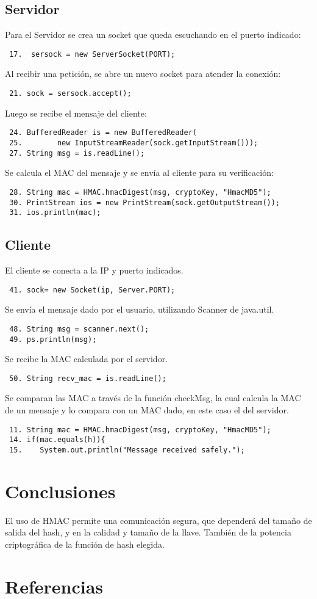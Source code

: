 \documentclass[letter, 10pt]{article}
\begin{document}
\subsection{Servidor}
Para el Servidor se crea un socket que queda escuchando en el puerto indicado:
\begin{verbatim}
 17.  sersock = new ServerSocket(PORT);
\end{verbatim}
Al recibir una petición, se abre un nuevo socket para atender la conexión:
\begin{verbatim}
 21. sock = sersock.accept();
\end{verbatim}
Luego se recibe el mensaje del cliente:
\begin{verbatim}
 24. BufferedReader is = new BufferedReader(
 25.        new InputStreamReader(sock.getInputStream()));
 27. String msg = is.readLine();
\end{verbatim}
Se calcula el MAC del mensaje y se envía al cliente para su verificación:
\begin{verbatim}
 28. String mac = HMAC.hmacDigest(msg, cryptoKey, "HmacMD5"); 
 30. PrintStream ios = new PrintStream(sock.getOutputStream());
 31. ios.println(mac);
\end{verbatim}

\subsection{Cliente}
El cliente se conecta a la IP y puerto indicados.
\begin{verbatim}
 41. sock= new Socket(ip, Server.PORT);
\end{verbatim}
Se envía el mensaje dado por el usuario, utilizando Scanner de java.util.
\begin{verbatim}
 48. String msg = scanner.next(); 
 49. ps.println(msg); 
\end{verbatim}
Se recibe la MAC calculada por el servidor.
\begin{verbatim}
 50. String recv_mac = is.readLine();  
\end{verbatim}
Se comparan las MAC a través de la función checkMsg, la cual calcula la MAC de un mensaje
y lo compara con un MAC dado, en este caso el del servidor.
\begin{verbatim}
 11. String mac = HMAC.hmacDigest(msg, cryptoKey, "HmacMD5");
 14. if(mac.equals(h)){                                 
 15.    System.out.println("Message received safely.");
\end{verbatim}

\newpage
\section{Conclusiones}
El uso de HMAC permite una comunicación segura, que dependerá del tamaño de salida del hash, y en la calidad
y tamaño de la llave. También de la potencia criptográfica de la función de hash elegida.


\section{Referencias}
\end{document}
